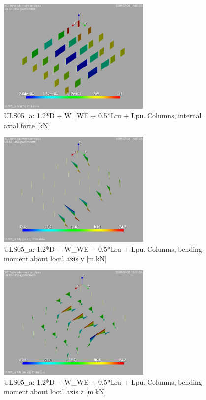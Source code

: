 \begin{figure}
\begin{center}
\includegraphics[width=75mm]{annex_res_columns/graphics/resSimplLC/ULS05_acolumnsN}
\caption{ULS05\_a: 1.2*D + W\_WE + 0.5*Lru + Lpu. Columns, internal axial force [kN]}
\end{center}
\end{figure}
\begin{figure}
\begin{center}
\includegraphics[width=75mm]{annex_res_columns/graphics/resSimplLC/ULS05_acolumnsMy}
\caption{ULS05\_a: 1.2*D + W\_WE + 0.5*Lru + Lpu. Columns, bending moment about local axis y [m.kN]}
\end{center}
\end{figure}
\begin{figure}
\begin{center}
\includegraphics[width=75mm]{annex_res_columns/graphics/resSimplLC/ULS05_acolumnsMz}
\caption{ULS05\_a: 1.2*D + W\_WE + 0.5*Lru + Lpu. Columns, bending moment about local axis z [m.kN]}
\end{center}
\end{figure}
